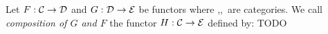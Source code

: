 \begin{defin}\label{Fun:def:composition}
    Let $F:\mbox{$\cal C$}\to\mbox{$\cal D$}$ and $G:\mbox{$\cal D$}\to\mbox{$\cal E$}$ be functors where \Cat,\Dat,\Eat\ 
    are categories. We call {\em composition of $G$ and $F$} the functor
    $H:\mbox{$\cal C$}\to\mbox{$\cal E$}$ defined by:
    TODO
\end{defin}
